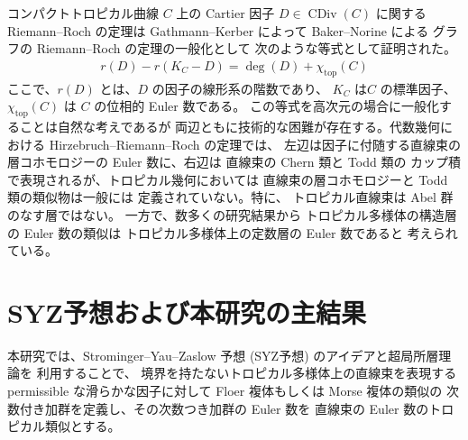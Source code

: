 \documentclass[uplatex,dvipdfmx,12pt]{jsarticle}
\numberwithin{equation}{section}
\theoremstyle{definition}
\newcommand{\opn}[1]{\operatorname{#1}}
\newcommand{\beforesection}{\vspace{-20pt}}
\newcommand{\aftersection}{\vspace{-10pt}}
\begin{document}
コンパクトトロピカル曲線 $C$ 上の Cartier 因子 
$D\in \opn{CDiv}(C)$
に関する Riemann--Roch の定理は
Gathmann--Kerber
\cite{gathmannRiemannRochTheoremTropical2008a} によって 
Baker--Norine \cite{MR2355607}による
グラフの Riemann--Roch の定理の一般化として
次のような等式として証明された。
\begin{align} \label{equation-tropical-rr}
r(D)-r(K_C-D)=\opn{deg}(D)+\chi_{\mathrm{top}}(C)
\end{align}
ここで、$r(D)$ とは、$D$ の因子の線形系の階数であり、
$K_C$ は$C$ の標準因子、$\chi_{\mathrm{top}}(C)$ は
$C$ の位相的 Euler 数である。
この等式を高次元の場合に一般化することは自然な考えであるが
両辺ともに技術的な困難が存在する。代数幾何における
Hirzebruch--Riemann--Roch の定理では、
左辺は因子に付随する直線束の層コホモロジーの
Euler 数に、右辺は 直線束の Chern 類と Todd 類の
カップ積で表現されるが、トロピカル幾何においては
直線束の層コホモロジーと Todd 類の類似物は一般には
定義されていない。特に、
トロピカル直線束は Abel 群のなす層ではない。
一方で、数多くの研究結果から
トロピカル多様体の構造層の Euler 数の類似は
トロピカル多様体上の定数層の Euler 数であると
考えられている。

\beforesection

\section{SYZ予想および本研究の主結果}

\aftersection

本研究では、Strominger--Yau--Zaslow 予想 (SYZ予想)
のアイデアと超局所層理論\cite{MR1299726}を
利用することで、
境界を持たないトロピカル多様体上の直線束を表現する 
permissible な滑らかな因子に対して
Floer 複体もしくは Morse 複体の類似の
次数付き加群を定義し、その次数つき加群の 
Euler 数を 直線束の Euler 数のトロピカル類似とする。
\end{document}
